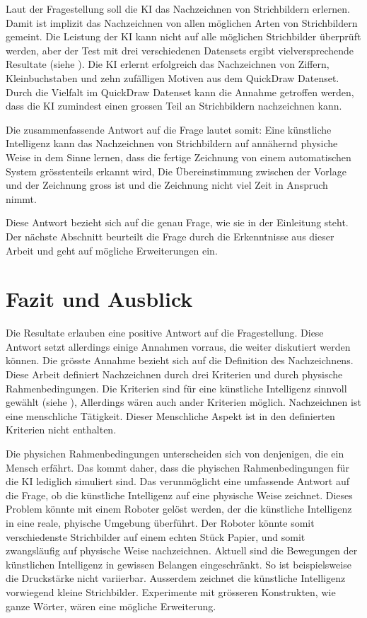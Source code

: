 Laut der Fragestellung soll die KI das Nachzeichnen von Strichbildern erlernen.
Damit ist implizit das Nachzeichnen von allen möglichen Arten von Strichbildern
gemeint. Die Leistung der KI kann nicht auf alle möglichen Strichbilder
überprüft werden, aber der Test mit drei verschiedenen Datensets ergibt
vielversprechende Resultate (siehe ). Die KI erlernt
erfolgreich das Nachzeichnen von Ziffern, Kleinbuchstaben und zehn zufälligen
Motiven aus dem QuickDraw Datenset. Durch die Vielfalt im QuickDraw Datenset
kann die Annahme getroffen werden, dass die KI zumindest einen grossen Teil an
Strichbildern nachzeichnen kann. 

Die zusammenfassende Antwort auf die Frage lautet somit: Eine künstliche
Intelligenz kann das Nachzeichnen von Strichbildern auf annähernd physiche Weise
in dem Sinne lernen, dass die fertige Zeichnung von einem automatischen System
grösstenteils erkannt wird, Die Übereinstimmung zwischen der Vorlage und der
Zeichnung gross ist und die Zeichnung nicht viel Zeit in Anspruch nimmt.

Diese Antwort bezieht sich auf die genau Frage, wie sie in der Einleitung steht.
Der nächste Abschnitt beurteilt die Frage durch die Erkenntnisse aus dieser
Arbeit und geht auf mögliche Erweiterungen ein.


\section{Fazit und Ausblick}\label{chap:d_faz-aus}
Die Resultate erlauben eine positive Antwort auf die Fragestellung. Diese
Antwort setzt allerdings einige Annahmen vorraus, die weiter diskutiert werden
können. Die grösste Annahme bezieht sich auf die Definition des Nachzeichnens.
Diese Arbeit definiert Nachzeichnen durch drei Kriterien und durch physische
Rahmenbedingungen. Die Kriterien sind für eine künstliche Intelligenz sinnvoll
gewählt (siehe ), Allerdings wären auch ander
Kriterien möglich. Nachzeichnen ist eine menschliche Tätigkeit. Dieser
Menschliche Aspekt ist in den definierten Kriterien nicht enthalten.

Die physichen Rahmenbedingungen unterscheiden sich von denjenigen, die ein
Mensch erfährt. Das kommt daher, dass die phyischen Rahmenbedingungen für die KI
lediglich simuliert sind. Das verunmöglicht eine umfassende Antwort auf die
Frage, ob die künstliche Intelligenz auf eine physische Weise zeichnet. Dieses
Problem könnte mit einem Roboter gelöst werden, der die künstliche Intelligenz
in eine reale, phyische Umgebung überführt. Der Roboter könnte somit
verschiedenste Strichbilder auf einem echten Stück Papier, und somit
zwangsläufig auf physische Weise nachzeichnen. Aktuell sind die Bewegungen der
künstlichen Intelligenz in gewissen Belangen eingeschränkt. So ist
beispielsweise die Druckstärke nicht variierbar. Ausserdem zeichnet die
künstliche Intelligenz vorwiegend kleine Strichbilder. Experimente mit grösseren
Konstrukten, wie ganze Wörter, wären eine mögliche Erweiterung. 

